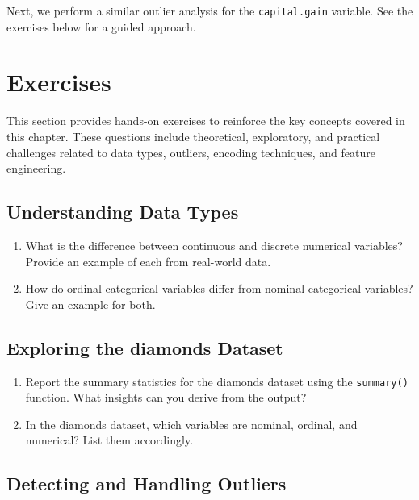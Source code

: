 \documentclass[
  11pt,
]{book}
\newcommand{\passthrough}[1]{#1}
\providecommand{\tightlist}{%
  \setlength{\itemsep}{0pt}\setlength{\parskip}{0pt}}
\theoremstyle{definition}
\theoremstyle{definition}
\theoremstyle{definition}
\theoremstyle{definition}
\theoremstyle{remark}
\begin{document}
Next, we perform a similar outlier analysis for the \passthrough{\lstinline!capital.gain!} variable. See the exercises below for a guided approach.

\section{Exercises}\label{exercises-1}

This section provides hands-on exercises to reinforce the key concepts covered in this chapter. These questions include theoretical, exploratory, and practical challenges related to data types, outliers, encoding techniques, and feature engineering.

\subsection*{Understanding Data Types}\label{understanding-data-types}


\begin{enumerate}
\def\labelenumi{\arabic{enumi}.}
\tightlist
\item
  What is the difference between continuous and discrete numerical variables? Provide an example of each from real-world data.\\
\item
  How do ordinal categorical variables differ from nominal categorical variables? Give an example for both.
\end{enumerate}

\subsection*{Exploring the diamonds Dataset}\label{exploring-the-diamonds-dataset}


\begin{enumerate}
\def\labelenumi{\arabic{enumi}.}
\setcounter{enumi}{2}
\tightlist
\item
  Report the summary statistics for the diamonds dataset using the \passthrough{\lstinline!summary()!} function. What insights can you derive from the output?\\
\item
  In the diamonds dataset, which variables are nominal, ordinal, and numerical? List them accordingly.
\end{enumerate}

\subsection*{Detecting and Handling Outliers}\label{detecting-and-handling-outliers}
\end{document}
